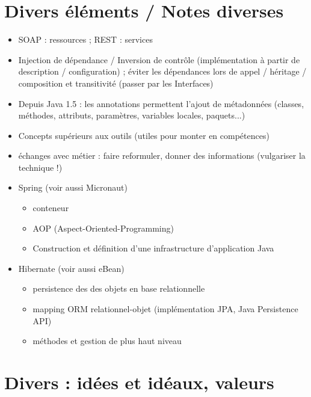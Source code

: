 \documentclass[11pt,twoside,a4paper]{article}
\begin{document}
\begin{landscape}
\begin{multicols}{2}
	\vfill
	
	\columnbreak
	
	
	\section*{Divers {\'e}l{\'e}ments / Notes diverses}
	
	\begin{itemize}
		\item SOAP : ressources ; REST : services
		\item Injection de d{\'e}pendance / Inversion de contr{\^o}le (impl{\'e}mentation {\`a} partir de description / configuration) ; {\'e}viter les d{\'e}pendances lors de appel / h{\'e}ritage / composition et transitivit{\'e} (passer par les Interfaces)
		\item Depuis Java 1.5 : les annotations permettent l'ajout de m{\'e}tadonn{\'e}es (classes, m{\'e}thodes, attributs, param{\`e}tres, variables locales, paquets...)
		\item Concepts sup{\'e}rieurs aux outils (utiles pour monter en comp{\'e}tences)
		\item {\'e}changes avec m{\'e}tier : faire reformuler, donner des informations (vulgariser la technique !)
		\item Spring (voir aussi Micronaut)
		\begin{itemize}
			\item conteneur
			\item AOP (Aspect-Oriented-Programming)
			\item Construction et d{\'e}finition d'une infrastructure d'application Java
		\end{itemize}
		\item Hibernate (voir aussi eBean)
		\begin{itemize}
			\item persistence des des objets en base relationnelle
			\item mapping ORM relationnel-objet (impl{\'e}mentation JPA, Java Persistence API)
			\item m{\'e}thodes et gestion de plus haut niveau
		\end{itemize}
	\end{itemize}
	
	\section*{Divers : idées et idéaux, valeurs}
	

\end{multicols}
\end{landscape}
\end{document}
